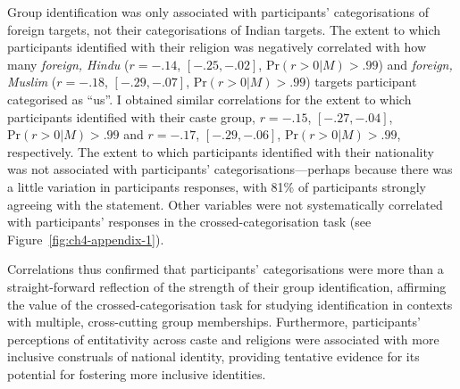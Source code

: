 \documentclass[12pt, a4paper]{article}
\begin{document}
Group identification was only associated with participants' categorisations of foreign targets, not their categorisations of Indian targets. The extent to which participants identified with their religion was negatively correlated with how many \emph{foreign, Hindu} ($r = -.14$, $[-.25, -.02]$, $\text{Pr} (r > 0| M) > .99$) and \emph{foreign, Muslim} ($r = -.18$, $[-.29, -.07]$, $\text{Pr} (r > 0| M) > .99$) targets participant categorised as ``us''. I obtained similar correlations for the extent to which participants identified with their caste group, $r = -.15$, $[-.27, -.04]$, $\text{Pr} (r > 0| M) > .99$ and $r = -.17$, $[-.29, -.06]$, $\text{Pr} (r > 0| M) > .99$, respectively. The extent to which participants identified with their nationality was not associated with participants' categorisations---perhaps because there was a little variation in participants responses, with 81\% of participants strongly agreeing with the statement. Other variables were not systematically correlated with participants' responses in the crossed-categorisation task (see Figure~\ref{fig:ch4-appendix-1}).

Correlations thus confirmed that participants' categorisations were more than a straight-forward reflection of the strength of their group identification, affirming the value of the crossed-categorisation task for studying identification in contexts with multiple, cross-cutting group memberships. Furthermore, participants' perceptions of entitativity across caste and religions were associated with more inclusive construals of national identity, providing tentative evidence for its potential for fostering more inclusive identities.



\end{document}

